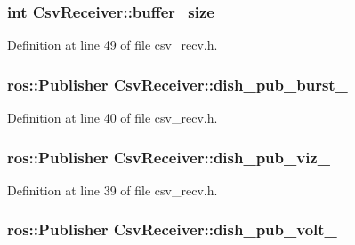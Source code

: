 \subsubsection[{buffer\-\_\-size\-\_\-}]{\setlength{\rightskip}{0pt plus 5cm}int {\bf \-Csv\-Receiver\-::buffer\-\_\-size\-\_\-}\hspace{0.3cm}{\ttfamily  [private]}}\label{classCsvReceiver_a0da87c113f0da5fd45cf7c1c4a6a006d}


\-Definition at line 49 of file csv\-\_\-recv.\-h.

\subsubsection[{dish\-\_\-pub\-\_\-burst\-\_\-}]{\setlength{\rightskip}{0pt plus 5cm}ros\-::\-Publisher {\bf \-Csv\-Receiver\-::dish\-\_\-pub\-\_\-burst\-\_\-}\hspace{0.3cm}{\ttfamily  [private]}}\label{classCsvReceiver_a790f1b626b4742122683d57b8d7d8c4f}


\-Definition at line 40 of file csv\-\_\-recv.\-h.

\subsubsection[{dish\-\_\-pub\-\_\-viz\-\_\-}]{\setlength{\rightskip}{0pt plus 5cm}ros\-::\-Publisher {\bf \-Csv\-Receiver\-::dish\-\_\-pub\-\_\-viz\-\_\-}\hspace{0.3cm}{\ttfamily  [private]}}\label{classCsvReceiver_a57e5d61099e7c4b1d7f6ad71c02bbe38}


\-Definition at line 39 of file csv\-\_\-recv.\-h.

\subsubsection[{dish\-\_\-pub\-\_\-volt\-\_\-}]{\setlength{\rightskip}{0pt plus 5cm}ros\-::\-Publisher {\bf \-Csv\-Receiver\-::dish\-\_\-pub\-\_\-volt\-\_\-}\hspace{0.3cm}{\ttfamily  [private]}}\label{classCsvReceiver_a122eec9ee25499444f35424e3a4f786b}


